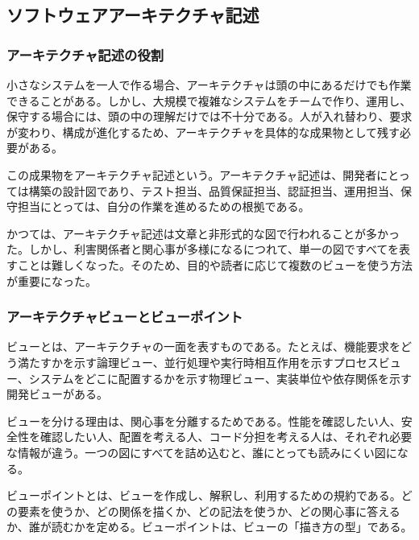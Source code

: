 \subsection{ソフトウェアアーキテクチャ記述}

\subsubsection*{アーキテクチャ記述の役割}
小さなシステムを一人で作る場合、アーキテクチャは頭の中にあるだけでも作業できることがある。しかし、大規模で複雑なシステムをチームで作り、運用し、保守する場合には、頭の中の理解だけでは不十分である。人が入れ替わり、要求が変わり、構成が進化するため、アーキテクチャを具体的な成果物として残す必要がある。

この成果物をアーキテクチャ記述という。アーキテクチャ記述は、開発者にとっては構築の設計図であり、テスト担当、品質保証担当、認証担当、運用担当、保守担当にとっては、自分の作業を進めるための根拠である。

かつては、アーキテクチャ記述は文章と非形式的な図で行われることが多かった。しかし、利害関係者と関心事が多様になるにつれて、単一の図ですべてを表すことは難しくなった。そのため、目的や読者に応じて複数のビューを使う方法が重要になった。

\subsubsection{アーキテクチャビューとビューポイント}
ビューとは、アーキテクチャの一面を表すものである。たとえば、機能要求をどう満たすかを示す論理ビュー、並行処理や実行時相互作用を示すプロセスビュー、システムをどこに配置するかを示す物理ビュー、実装単位や依存関係を示す開発ビューがある。

ビューを分ける理由は、関心事を分離するためである。性能を確認したい人、安全性を確認したい人、配置を考える人、コード分担を考える人は、それぞれ必要な情報が違う。一つの図にすべてを詰め込むと、誰にとっても読みにくい図になる。

ビューポイントとは、ビューを作成し、解釈し、利用するための規約である。どの要素を使うか、どの関係を描くか、どの記法を使うか、どの関心事に答えるか、誰が読むかを定める。ビューポイントは、ビューの「描き方の型」である。

